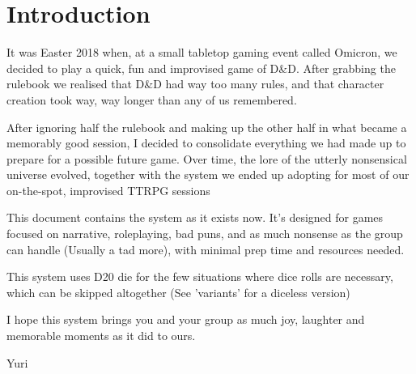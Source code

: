 \chapter*{Introduction}
\thispagestyle{empty}


\par 
It was Easter 2018 when, at a small tabletop gaming event called Omicron, we decided to play a quick, fun and improvised game of D\&D. After grabbing the rulebook we realised that D\&D had way too many rules, and that character creation took way, way longer than any of us remembered. 
\par 
After ignoring half the rulebook and making up the other half in what became a memorably good session, I decided to consolidate everything we had made up to prepare for a possible future game. Over time, the lore of the utterly nonsensical universe evolved, together with the system we ended up adopting for most of our on-the-spot, improvised TTRPG sessions
\par
This document contains the system as it exists now. It's designed for games focused on narrative, roleplaying, bad puns, and as much nonsense as the group can handle (Usually a tad more), with minimal prep time and resources needed.
\par 
This system uses D20 die for the few situations where dice rolls are necessary, which can be skipped altogether (See 'variants' for a diceless version)
\par
I hope this system brings you and your group as much joy, laughter and memorable moments as it did to ours. 
\par 
Yuri